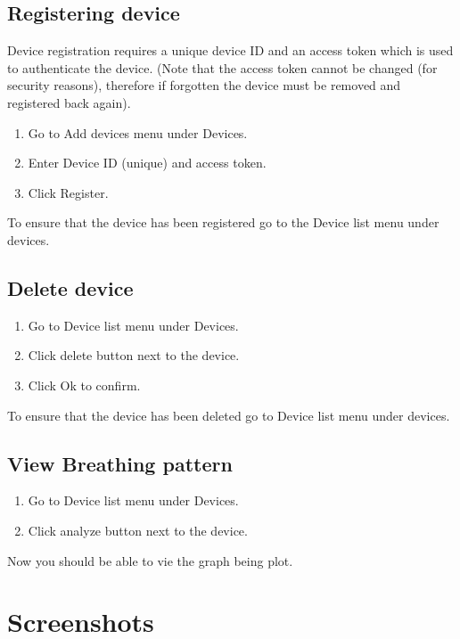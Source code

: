 \documentclass{report}
\begin{document}
\subsection{Registering device}

Device registration requires a unique device ID and an access token which is used to authenticate the device. (Note that the access token cannot be changed (for security reasons), therefore if forgotten the device must be removed and registered back again).

\begin{enumerate}
  \item Go to Add devices menu under Devices.
  \item Enter Device ID (unique) and access token.
  \item Click Register.
\end{enumerate}

To ensure that the device has been registered go to the Device list menu under devices.

\subsection{Delete device}

\begin{enumerate}
  \item Go to Device list menu under Devices.
  \item Click delete button next to the device.
  \item Click Ok to confirm.
\end{enumerate}

To ensure that the device has been deleted go to Device list menu under devices.

\subsection{View Breathing pattern}

\begin{enumerate}
  \item Go to Device list menu under Devices.
  \item Click analyze button next to the device.
\end{enumerate}

Now you should be able to vie the graph being plot.
\clearpage
\section{Screenshots}
\end{document}

